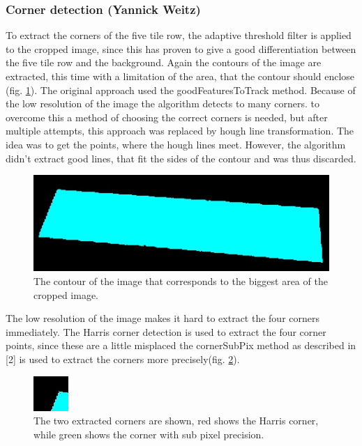 \documentclass{article}
\begin{document}
\subsubsection*{Corner detection (Yannick Weitz)}
To extract the corners of the five tile row, the adaptive threshold filter is applied to the cropped image, since this has proven to give a good differentiation between the five tile row and the background. Again the contours of the image are extracted, this time with a limitation of the area, that the contour should enclose (fig. \ref{fig:five}). The original approach used the goodFeaturesToTrack method. Because of the low resolution of the image the algorithm detects to many corners. to overcome this a method of choosing the correct corners is needed, but after multiple attempts, this approach was replaced by hough line transformation. The idea was to get the points, where the hough lines meet. However, the algorithm didn't extract good lines, that fit the sides of the contour and was thus discarded.\\

\begin{figure}[h!]
\centering
\includegraphics[scale=0.3]{images/5tiles.jpg}
\caption{The contour of the image that corresponds to the biggest area of the cropped image.}
\label{fig:five}
\end{figure}

The low resolution of the image makes it hard to extract the four corners immediately. The Harris corner detection is used to extract the four corner points, since these are a little misplaced the cornerSubPix method as described in [2] is used to extract the corners more precisely(fig. \ref{fig:points}).  \\

\begin{figure}[h!]
\centering
\includegraphics[scale=1]{images/Corners.jpg}
\caption{The two extracted corners are shown, red shows the Harris corner, while green shows the corner with sub pixel precision.}
\label{fig:points}
\end{figure}
\end{document}
